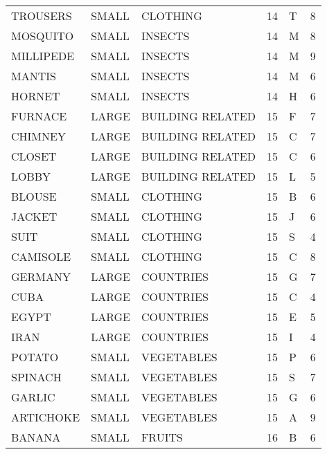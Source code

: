 \begin{tabular}{lllrlr}
    TROUSERS & SMALL &         CLOTHING &       14 &            T &       8 \\
    MOSQUITO & SMALL &          INSECTS &       14 &            M &       8 \\
   MILLIPEDE & SMALL &          INSECTS &       14 &            M &       9 \\
      MANTIS & SMALL &          INSECTS &       14 &            M &       6 \\
      HORNET & SMALL &          INSECTS &       14 &            H &       6 \\
     FURNACE & LARGE & BUILDING RELATED &       15 &            F &       7 \\
     CHIMNEY & LARGE & BUILDING RELATED &       15 &            C &       7 \\
      CLOSET & LARGE & BUILDING RELATED &       15 &            C &       6 \\
       LOBBY & LARGE & BUILDING RELATED &       15 &            L &       5 \\
      BLOUSE & SMALL &         CLOTHING &       15 &            B &       6 \\
      JACKET & SMALL &         CLOTHING &       15 &            J &       6 \\
        SUIT & SMALL &         CLOTHING &       15 &            S &       4 \\
    CAMISOLE & SMALL &         CLOTHING &       15 &            C &       8 \\
     GERMANY & LARGE &        COUNTRIES &       15 &            G &       7 \\
        CUBA & LARGE &        COUNTRIES &       15 &            C &       4 \\
       EGYPT & LARGE &        COUNTRIES &       15 &            E &       5 \\
        IRAN & LARGE &        COUNTRIES &       15 &            I &       4 \\
      POTATO & SMALL &       VEGETABLES &       15 &            P &       6 \\
     SPINACH & SMALL &       VEGETABLES &       15 &            S &       7 \\
      GARLIC & SMALL &       VEGETABLES &       15 &            G &       6 \\
   ARTICHOKE & SMALL &       VEGETABLES &       15 &            A &       9 \\
      BANANA & SMALL &           FRUITS &       16 &            B &       6 \\

\end{tabular}
